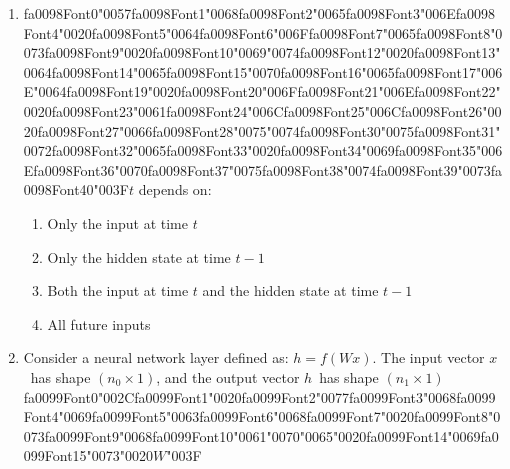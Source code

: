 \documentclass[12pt]{article}
\begin{document}
\begin{enumerate}[label=Q\arabic*.]
\item {\csname fa0098Font0\endcsname\char"0057}{\csname fa0098Font1\endcsname\char"0068}{\csname fa0098Font2\endcsname\char"0065}{\csname fa0098Font3\endcsname\char"006E}{\csname fa0098Font4\endcsname\char"0020}{\csname fa0098Font5\endcsname\char"0064}{\csname fa0098Font6\endcsname\char"006F}{\csname fa0098Font7\endcsname\char"0065}{\csname fa0098Font8\endcsname\char"0073}{\csname fa0098Font9\endcsname\char"0020}{\csname fa0098Font10\endcsname\char"0069}{\char"0074}{\csname fa0098Font12\endcsname\char"0020}{\csname fa0098Font13\endcsname\char"0064}{\csname fa0098Font14\endcsname\char"0065}{\csname fa0098Font15\endcsname\char"0070}{\csname fa0098Font16\endcsname\char"0065}{\csname fa0098Font17\endcsname\char"006E}{\char"0064}{\csname fa0098Font19\endcsname\char"0020}{\csname fa0098Font20\endcsname\char"006F}{\csname fa0098Font21\endcsname\char"006E}{\csname fa0098Font22\endcsname\char"0020}{\csname fa0098Font23\endcsname\char"0061}{\csname fa0098Font24\endcsname\char"006C}{\csname fa0098Font25\endcsname\char"006C}{\csname fa0098Font26\endcsname\char"0020}{\csname fa0098Font27\endcsname\char"0066}{\csname fa0098Font28\endcsname\char"0075}{\char"0074}{\csname fa0098Font30\endcsname\char"0075}{\csname fa0098Font31\endcsname\char"0072}{\csname fa0098Font32\endcsname\char"0065}{\csname fa0098Font33\endcsname\char"0020}{\csname fa0098Font34\endcsname\char"0069}{\csname fa0098Font35\endcsname\char"006E}{\csname fa0098Font36\endcsname\char"0070}{\csname fa0098Font37\endcsname\char"0075}{\csname fa0098Font38\endcsname\char"0074}{\csname fa0098Font39\endcsname\char"0073}{\csname fa0098Font40\endcsname\char"003F}$t$ depends on:
\begin{enumerate}[label=(\Alph*)]
    \item Only the input at time $t$
    \item Only the hidden state at time $t-1$
    \item Both the input at time $t$ and the hidden state at time $t-1$
    \item All future inputs
\end{enumerate}
\item Consider a neural network layer defined as: $h = f(Wx)$. The input vector $x$\  has shape $(n_0 \times 1)$, and the output vector $h$\  has shape $(n_1 \times 1)${\csname fa0099Font0\endcsname\char"002C}{\csname fa0099Font1\endcsname\char"0020}{\csname fa0099Font2\endcsname\char"0077}{\csname fa0099Font3\endcsname\char"0068}{\csname fa0099Font4\endcsname\char"0069}{\csname fa0099Font5\endcsname\char"0063}{\csname fa0099Font6\endcsname\char"0068}{\csname fa0099Font7\endcsname\char"0020}{\csname fa0099Font8\endcsname\char"0073}{\csname fa0099Font9\endcsname\char"0068}{\csname fa0099Font10\endcsname\char"0061}{\char"0070}{\char"0065}{\char"0020}{\csname fa0099Font14\endcsname\char"0069}{\csname fa0099Font15\endcsname\char"0073}{\char"0020}$W${\char"003F}

\end{enumerate}
\end{document}
